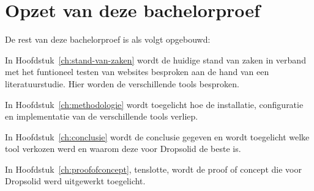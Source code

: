 
\section{Opzet van deze bachelorproef}
\label{sec:opzet-bachelorproef}


De rest van deze bachelorproef is als volgt opgebouwd:

In Hoofdstuk~\ref{ch:stand-van-zaken} wordt de huidige stand van zaken in verband met het funtioneel testen van websites besproken aan de hand van een literatuurstudie. Hier worden de verschillende \glspl{tool} besproken.

In Hoofdstuk~\ref{ch:methodologie} wordt toegelicht hoe de installatie, configuratie en implementatie van de verschillende \glspl{tool} verliep.


In Hoofdstuk~\ref{ch:conclusie} wordt de conclusie gegeven en wordt toegelicht welke \gls{tool} verkozen werd en waarom deze voor Dropsolid de beste is.

In Hoofdstuk~\ref{ch:proofofconcept}, tenslotte, wordt de proof of concept die voor Dropsolid werd uitgewerkt toegelicht.
